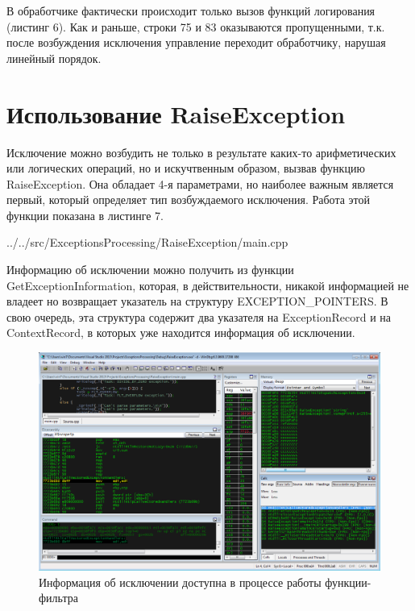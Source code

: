 \documentclass[a4paper, 12pt]{report}		%
\begin{document}
В обработчике фактически происходит только вызов функций логирования (листинг 6). Как и раньше, строки 75 и 83 оказываются пропущенными, т.к. после возбуждения исключения управление переходит обработчику, нарушая линейный порядок.




\chapter*{Использование RaiseException}

Исключение можно возбудить не только в результате каких-то арифметических или логических операций, но и искучтвенным образом, вызвав функцию RaiseException. Она обладает 4-я параметрами, но наиболее важным является первый, который определяет тип возбуждаемого исключения. Работа этой функции показана в листинге 7.


{../../src/ExceptionsProcessing/RaiseException/main.cpp}

Информацию об исключении можно получить из функции GetExceptionInformation, которая, в действительности, никакой информацией не владеет но возвращает указатель на структуру EXCEPTION\_POINTERS. В свою очередь, эта структура содержит два указателя на ExceptionRecord и на ContextRecord, в которых уже находится информация об исключении.

\begin{figure}[h!]
\centering
\includegraphics[scale=0.5]{res/005}
\caption{Информация об исключении доступна в процессе работы функции-фильтра}
\end{figure}
\end{document}
